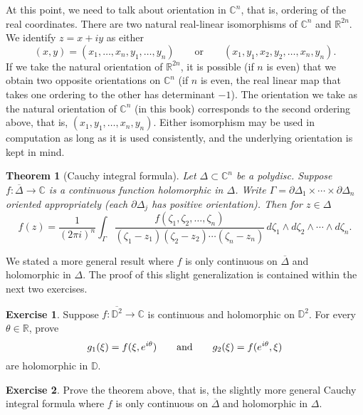 \documentclass[12pt,openany]{book}
\newcommand{\avoidbreak}{\postdisplaypenalty=100}
\newcommand{\C}{{\mathbb{C}}}
\newcommand{\R}{{\mathbb{R}}}
\newcommand{\D}{{\mathbb{D}}}
\theoremstyle{plain}
\newtheorem{thm}{Theorem}[section]
\theoremstyle{remark}
\theoremstyle{definition}
\newenvironment{exbox}{%
    \def\FrameCommand{\vrule width 1pt \relax\hspace{10pt}}%
    \MakeFramed {\advance \hsize -\width \FrameRestore}%
}{%
    \endMakeFramed
}
\theoremstyle{exercise}
\newtheorem{exercise}{Exercise}[section]
\theoremstyle{example}
\begin{document}
At this point, we need to talk about orientation in $\C^n$, that is,
ordering of the real coordinates.  There are two
natural real-linear isomorphisms of $\C^n$ and $\R^{2n}$.  We
identify $z = x+iy$ as either
\begin{equation*}
(x,y) = (x_1,\ldots,x_n,y_1,\ldots,y_n) \qquad
\text{or} \qquad
(x_1,y_1,x_2,y_2,\ldots,x_n,y_n) .
\end{equation*}
If we take the natural orientation of $\R^{2n}$,
it is possible (if $n$ is even) that we obtain
two opposite orientations on $\C^n$ (if $n$ is even, the real linear map
that takes one ordering to the other has determinant $-1$).
The orientation we take as the natural orientation of $\C^n$ (in this book)
corresponds to
the second ordering above, that
is, $(x_1,y_1,\ldots,x_n,y_n)$.  Either isomorphism may be used
in computation as long as it is used consistently, and the underlying
orientation is kept in mind.

\begin{thm}[Cauchy integral formula]
Let $\Delta \subset \C^n$ be a polydisc. 
Suppose
$f \colon \overline{\Delta} \to \C$ is a continuous function
holomorphic in $\Delta$.
Write $\Gamma = \partial \Delta_1 \times \cdots \times \partial \Delta_n$
oriented appropriately (each $\partial \Delta_j$ has positive orientation).
Then for $z \in \Delta$
\begin{equation*}
f(z) =
\frac{1}{{(2\pi i)}^n}
\int_{\Gamma}
\frac{f(\zeta_1,\zeta_2,\ldots,\zeta_n)}{(\zeta_1-z_1)(\zeta_2-z_2)\cdots(\zeta_n-z_n)}
\,
d \zeta_1 
\wedge
d \zeta_2
\wedge
\cdots
\wedge
d \zeta_n .
\end{equation*}
\end{thm}

We stated a more general result where $f$ is only continuous 
on $\overline{\Delta}$ and holomorphic in $\Delta$.  The proof of this
slight generalization is contained within the next two exercises.

\begin{exbox}
\begin{exercise}
Suppose $f \colon \overline{\D^2} \to \C$ is continuous and holomorphic
on $\D^2$.  For every $\theta \in \R$, prove
\begin{equation*}
g_1(\xi) = f(\xi,e^{i\theta}) \qquad \text{and} \qquad
g_2(\xi) = f(e^{i\theta},\xi)
\avoidbreak
\end{equation*}
are holomorphic in $\D$.
\end{exercise}

\begin{exercise}
Prove the theorem above, that is, the slightly more general Cauchy integral
formula where $f$ is only continuous on $\overline{\Delta}$ and
holomorphic in $\Delta$.
\end{exercise}
\end{exbox}
\end{document}
